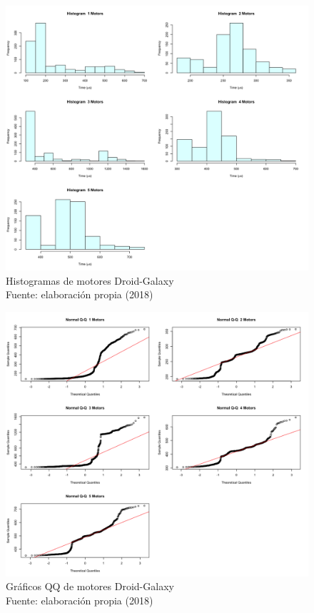 \begin{figure}
 \begin{center} 
   	\includegraphics[width=1.0\textwidth]{evaluation/graphics/Droid/Galaxy/HistMotorsDroidGalaxy.png} 
    \caption[Histogramas de motores Droid-Galaxy]{Histogramas de motores  Droid-Galaxy\\Fuente: elaboración propia (2018)} 
    \label{fig:droid-galaxy-hist-motors}
  \end{center}
\end{figure}

\begin{figure}[H]
  \begin{center} 
   	\includegraphics[width=1.0\textwidth]{evaluation/graphics/Droid/Galaxy/NormalQQMotorsDroidGalaxy.png} 
    \caption[Gráfico QQ de motores Droid-Galaxy]{Gráficos QQ de motores Droid-Galaxy\\Fuente: elaboración propia (2018)} 
    \label{fig:droid-galaxy-QQ-motors}
  \end{center}
\end{figure}

